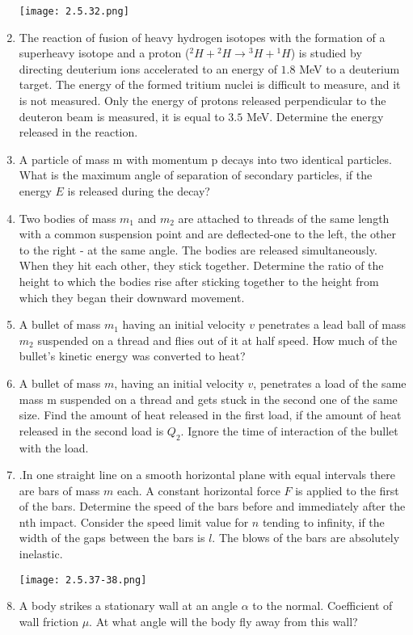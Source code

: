 \documentclass{article}
\begin{document}
\begin{enumerate}[label=2.5.\arabic*]
\begin{center}
    \texttt{[image: 2.5.32.png]}
\end{center}

\item The reaction of fusion of heavy hydrogen isotopes with the formation of a superheavy isotope and a proton (${}^2H + {}^2H \to {}^3H + {}^1H$) is studied by directing deuterium ions accelerated to an energy of $1.8$ MeV to a deuterium target. The energy of the formed tritium nuclei is difficult to measure, and it is not measured. Only the energy of protons released perpendicular to the deuteron beam is measured, it is equal to $3.5$ MeV. Determine the energy released in the reaction.

\item A particle of mass m with momentum p decays into two identical particles. What is the maximum angle of separation of secondary particles, if the energy $E$ is released during the decay?

\item Two bodies of mass $m_1$ and $m_2$ are attached to threads of the same length with a common suspension point and are deflected-one to the left, the other to the right - at the same angle. The bodies are released simultaneously. When they hit each other, they stick together. Determine the ratio of the height to which the bodies rise after sticking together to the height from which they began their downward movement.

\item A bullet of mass $m_1$ having an initial velocity $v$ penetrates a lead ball of mass $m_2$ suspended on a thread and flies out of it at half speed. How much of the bullet's kinetic energy was converted to heat?

\item A bullet of mass $m$, having an initial velocity $v$, penetrates a load of the same mass m suspended on a thread and gets stuck in the second one of the same size. Find the amount of heat released in the first load, if the amount of heat released in the second load is $Q_2$. Ignore the time of interaction of the bullet with the load.

\item.In one straight line on a smooth horizontal plane with equal intervals there are bars of mass $m$ each. A constant horizontal force $F$ is applied to the first of the bars. Determine the speed of the bars before and immediately after the nth impact. Consider the speed limit value for $n$ tending to infinity, if the width of the gaps between the bars is $l$. The blows of the bars are absolutely inelastic.

\begin{center}
    \texttt{[image: 2.5.37-38.png]}
\end{center}

\item A body strikes a stationary wall at an angle $\alpha$ to the normal. Coefficient of wall friction $\mu$. At what angle will the body fly away from this wall?


\end{enumerate}
\end{document}
